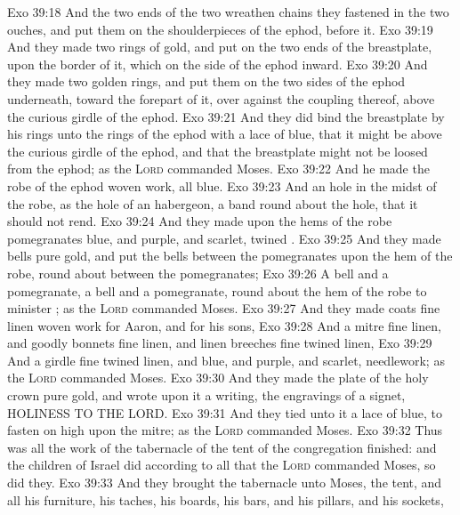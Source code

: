 \vs Exo 39:18 And the two ends of the two wreathen chains they fastened in the two ouches, and put them on the shoulderpieces of the ephod, before it.
\vs Exo 39:19 And they made two rings of gold, and put  on the two ends of the breastplate, upon the border of it, which  on the side of the ephod inward.
\vs Exo 39:20 And they made two  golden rings, and put them on the two sides of the ephod underneath, toward the forepart of it, over against the  coupling thereof, above the curious girdle of the ephod.
\vs Exo 39:21 And they did bind the breastplate by his rings unto the rings of the ephod with a lace of blue, that it might be above the curious girdle of the ephod, and that the breastplate might not be loosed from the ephod; as the \textsc{Lord} commanded Moses.
\vs Exo 39:22 And he made the robe of the ephod  woven work, all  blue.
\vs Exo 39:23 And  an hole in the midst of the robe, as the hole of an habergeon,  a band round about the hole, that it should not rend.
\vs Exo 39:24 And they made upon the hems of the robe pomegranates  blue, and purple, and scarlet,  twined .
\vs Exo 39:25 And they made bells  pure gold, and put the bells between the pomegranates upon the hem of the robe, round about between the pomegranates;
\vs Exo 39:26 A bell and a pomegranate, a bell and a pomegranate, round about the hem of the robe to minister ; as the \textsc{Lord} commanded Moses.
\vs Exo 39:27 And they made coats  fine linen  woven work for Aaron, and for his sons,
\vs Exo 39:28 And a mitre  fine linen, and goodly bonnets  fine linen, and linen breeches  fine twined linen,
\vs Exo 39:29 And a girdle  fine twined linen, and blue, and purple, and scarlet,  needlework; as the \textsc{Lord} commanded Moses.
\vs Exo 39:30 And they made the plate of the holy crown  pure gold, and wrote upon it a writing,  the engravings of a signet, HOLINESS TO THE LORD.
\vs Exo 39:31 And they tied unto it a lace of blue, to fasten  on high upon the mitre; as the \textsc{Lord} commanded Moses.
\vs Exo 39:32 Thus was all the work of the tabernacle of the tent of the congregation finished: and the children of Israel did according to all that the \textsc{Lord} commanded Moses, so did they.
\vs Exo 39:33 And they brought the tabernacle unto Moses, the tent, and all his furniture, his taches, his boards, his bars, and his pillars, and his sockets,

